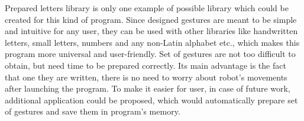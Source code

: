 Prepared letters library is only one example of possible library which could be created for this kind of program. Since designed gestures are meant to be simple and intuitive for any user, they can be used with other libraries like handwritten letters, small letters, numbers and any non-Latin alphabet etc., which makes this program more universal and user-friendly. Set of gestures are not too difficult to obtain, but need time to be prepared correctly. Its main advantage is the fact that one they are written, there is no need to worry about robot’s movements after launching the program. To make it easier for user, in case of future work, additional application could be proposed, which would automatically prepare set of gestures and save them in program’s memory.
